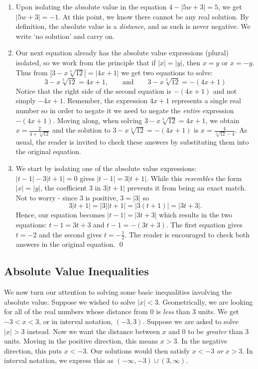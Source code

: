 \begin{ex}
\begin{enumerate}
\item  Upon isolating the absolute value in the equation $4 - |5w+3| = 5$, we get $|5w+3| = -1$.  At this point, we know there cannot be any real solution.  By definition, the absolute value is a \textit{distance}, and as such is never negative.  We write `no solution' and carry on.

\item Our next equation already has the absolute value expressions (plural) isolated, so we work from the principle that if $|x| = |y|$, then $x = y$ or $x = -y$. Thus from $\left|3 - x \sqrt[3]{12}\right| = |4x+1|$ we get two equations to solve:  \[ 3 - x \sqrt[3]{12} = 4x+1, \qquad \text{and} \qquad 3 - x \sqrt[3]{12} = -(4x+1) \] Notice that the right side of the second equation is $-(4x+1)$ and not simply $-4x+1$.  Remember, the expression $4x+1$ represents a single real number so in order to negate it we need to negate the \textit{entire} expression $-(4x+1)$. Moving along, when solving $3 - x \sqrt[3]{12} = 4x+1$, we obtain $x = \frac{2}{4 + \sqrt[3]{12}}$ and the solution to $3 - x \sqrt[3]{12} = -(4x+1)$ is $x = \frac{4}{\sqrt[3]{12}-4}$.  As usual, the reader is invited to check these answers by substituting them into the original equation.

\item We start by isolating one of the absolute value expressions:  $|t-1| - 3|t+1| = 0$ gives $|t-1| = 3|t+1|$.  While this \textit{resembles} the form $|x| = |y|$, the coefficient $3$ in $3|t+1|$ prevents it from being an exact match.  Not to worry - since $3$ is positive, $3 = |3|$ so \[3|t+1| = |3| |t+1| = |3(t+1)| = |3t+3|.\]  Hence, our equation becomes $|t-1| = |3t+3|$ which results in the two equations:  $t-1 = 3t+3$ and $t-1 = -(3t+3)$.  The first equation gives $t = -2$ and the second gives $t = -\frac{1}{2}$.  The reader is encouraged to check both answers in the original equation. \qed

\end{enumerate}

\end{ex}


\subsection{Absolute Value Inequalities}
\label{basicabsvalineq}

We now turn our attention to solving some basic inequalities involving the absolute value.  Suppose we wished to solve $|x| < 3$.  Geometrically, we are looking for all of the real numbers whose distance from $0$ is \textit{less} than $3$ units.  We get $-3 < x < 3$, or in interval notation, $(-3,3)$.  Suppose we are asked to solve $|x| > 3$ instead.  Now we want the distance between $x$ and $0$ to be \textit{greater} than $3$ units.  Moving in the positive direction, this means $x > 3$.  In the negative direction, this puts $x < -3$.  Our solutions would then satisfy $x < -3$ \textit{or} $x > 3$.  In interval notation, we express this as $(-\infty, -3) \cup (3, \infty)$.  

